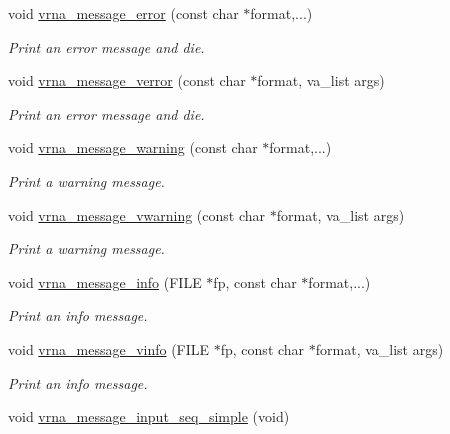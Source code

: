 \begin{DoxyCompactItemize}
\item 
void \mbox{\hyperlink{group__message__utils_ga36b35be01d7f36cf7f59c245eee628d1}{vrna\+\_\+message\+\_\+error}} (const char $\ast$format,...)
\begin{DoxyCompactList}\small\item\em Print an error message and die. \end{DoxyCompactList}\item 
void \mbox{\hyperlink{group__message__utils_gabc1a08dea0d84b5c33701732172a8b18}{vrna\+\_\+message\+\_\+verror}} (const char $\ast$format, va\+\_\+list args)
\begin{DoxyCompactList}\small\item\em Print an error message and die. \end{DoxyCompactList}\item 
void \mbox{\hyperlink{group__message__utils_ga6e07ed24add60693ba886d54d0a46635}{vrna\+\_\+message\+\_\+warning}} (const char $\ast$format,...)
\begin{DoxyCompactList}\small\item\em Print a warning message. \end{DoxyCompactList}\item 
void \mbox{\hyperlink{group__message__utils_ga377aa8ec8a49d343063adb22e6311f26}{vrna\+\_\+message\+\_\+vwarning}} (const char $\ast$format, va\+\_\+list args)
\begin{DoxyCompactList}\small\item\em Print a warning message. \end{DoxyCompactList}\item 
void \mbox{\hyperlink{group__message__utils_ga039bae6153a6415b054dbe6045f83d03}{vrna\+\_\+message\+\_\+info}} (F\+I\+LE $\ast$fp, const char $\ast$format,...)
\begin{DoxyCompactList}\small\item\em Print an info message. \end{DoxyCompactList}\item 
void \mbox{\hyperlink{group__message__utils_gad8b8139bd04fbfb51e398e9fcd6908dc}{vrna\+\_\+message\+\_\+vinfo}} (F\+I\+LE $\ast$fp, const char $\ast$format, va\+\_\+list args)
\begin{DoxyCompactList}\small\item\em Print an info message. \end{DoxyCompactList}\item 
void \mbox{\hyperlink{group__message__utils_gaee1dd652ca5b9e56b096963a1576f73b}{vrna\+\_\+message\+\_\+input\+\_\+seq\+\_\+simple}} (void)

\end{DoxyCompactItemize}
